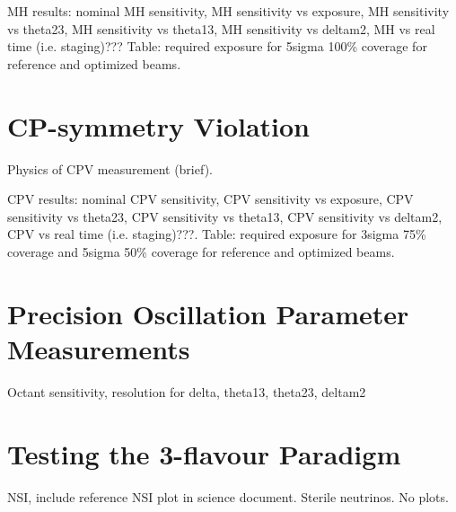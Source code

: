MH results: nominal MH sensitivity, MH sensitivity vs exposure, MH sensitivity vs theta23, MH sensitivity vs theta13, MH sensitivity vs deltam2, MH vs real time (i.e. staging)???  Table: required exposure for 5sigma 100\% coverage for reference and optimized beams.

\section{CP-symmetry Violation}
\label{sec:physics-lbnosc-cpv}

Physics of CPV measurement (brief).

CPV results: nominal CPV sensitivity, CPV sensitivity vs exposure, CPV sensitivity vs theta23, CPV sensitivity vs theta13, CPV sensitivity vs deltam2, CPV vs real time (i.e. staging)???. Table: required exposure for 3sigma 75\% coverage and 5sigma 50\% coverage for reference and optimized beams.

\section{Precision Oscillation Parameter Measurements}

Octant sensitivity, resolution for delta, theta13, theta23, deltam2

\section{Testing the 3-flavour Paradigm}
\label{sec:physics-lbnosc-3nutests}

NSI, include reference NSI plot in science document.  Sterile neutrinos.  No plots.

